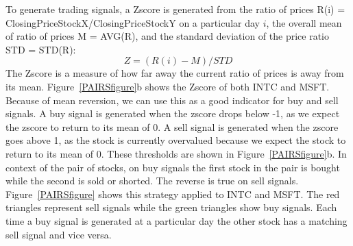 \documentclass[letterpaper,11pt]{article}
\begin{document}
To generate trading signals, a Zscore is generated from the ratio of prices R(i) = ClosingPriceStockX/ClosingPriceStockY on a particular day $i$, the overall mean of ratio of prices M = AVG(R), and the standard deviation of the price ratio STD = STD(R): \[ Z = (R(i) - M)/STD\] The Zscore is a measure of how far away the current ratio of prices is away from its mean. Figure~\ref{PAIRSfigure}b shows the Zscore of both INTC and MSFT. Because of mean reversion, we can use this as a good indicator for buy and sell signals. A buy signal is generated when the zscore drops below -1, as we expect the zscore to return to its mean of 0. A sell signal is generated when the zscore goes above 1, as the stock is currently overvalued because we expect the stock to return to its mean of 0\cite{Fu2009}. These thresholds are shown in Figure~\ref{PAIRSfigure}b. In context of the pair of stocks, on buy signals the first stock in the pair is bought while the second is sold or shorted. The reverse is true on sell signals. Figure~\ref{PAIRSfigure} shows this strategy applied to INTC and MSFT. The red triangles represent sell signals while the green triangles show buy signals. Each time a buy signal is generated at a particular day the other stock has a matching sell signal and vice versa.
\end{document}
